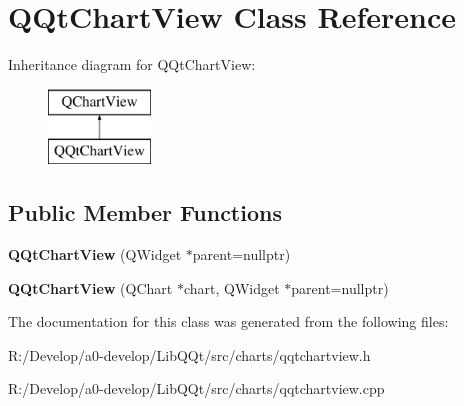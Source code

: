 \hypertarget{class_q_qt_chart_view}{}\section{Q\+Qt\+Chart\+View Class Reference}
\label{class_q_qt_chart_view}
Inheritance diagram for Q\+Qt\+Chart\+View\+:\begin{figure}[H]
\begin{center}
\leavevmode
\includegraphics[height=2.000000cm]{class_q_qt_chart_view}
\end{center}
\end{figure}
\subsection*{Public Member Functions}
\begin{DoxyCompactItemize}
\item 
\mbox{\label{class_q_qt_chart_view_adee5d33d00e225f21cdfbad8cbb3cc31}} 
{\bfseries Q\+Qt\+Chart\+View} (Q\+Widget $\ast$parent=nullptr)
\item 
\mbox{\label{class_q_qt_chart_view_a3a5269edf38c8d8f02b99f488be96ddf}} 
{\bfseries Q\+Qt\+Chart\+View} (Q\+Chart $\ast$chart, Q\+Widget $\ast$parent=nullptr)
\end{DoxyCompactItemize}


The documentation for this class was generated from the following files\+:\begin{DoxyCompactItemize}
\item 
R\+:/\+Develop/a0-\/develop/\+Lib\+Q\+Qt/src/charts/qqtchartview.\+h\item 
R\+:/\+Develop/a0-\/develop/\+Lib\+Q\+Qt/src/charts/qqtchartview.\+cpp\end{DoxyCompactItemize}
